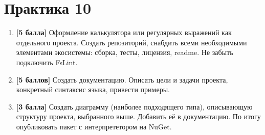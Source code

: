 \section{Практика 10}

\begin{enumerate}
    \item \textbf{[5 балла]} Оформление калькулятора или регулярных выражений как отдельного проекта. Создать репозиторий, снабдить всеми необходимыми элементами экосистемы: сборка, тесты, лицензия, readme. Не забыть подключить FsLint.
    \item \textbf{[5 баллов]} Создать документацию. Описать цели и задачи проекта, конкретный синтаксис языка, привести примеры.
    \item \textbf{[3 балла]} Создать диаграмму (наиболее подходящего типа), описывающую структуру проекта, выбранного выше. Добавить её в документацию. По итогу опубликовать пакет с интерпрететором на NuGet.
\end{enumerate}
